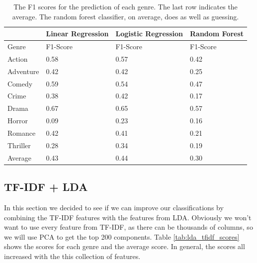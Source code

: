 \documentclass[11pt]{article}
\begin{document}
\begin{table}[h]
	\label{tab:lda_scores}
\begin{center}
	\begin{tabular}{| l | l | l | l |}
		\hline
		           & Linear Regression & Logistic Regression & Random Forest \\
		\hline
		Genre      & F1-Score          & F1-Score            & F1-Score       \\
	  	\hline			
	  	Action     & 0.58              & 0.57                & 0.42 \\
	  	Adventure  & 0.42              & 0.42                & 0.25 \\ 
	  	Comedy     & 0.59              & 0.54                & 0.47 \\
	  	Crime      & 0.38              & 0.42                & 0.17 \\
	  	Drama      & 0.67              & 0.65                & 0.57 \\
	  	Horror     & 0.09              & 0.23                & 0.16 \\
	  	Romance    & 0.42              & 0.41                & 0.21 \\
	  	Thriller   & 0.28              & 0.34                & 0.19 \\
	  	\hline
	  	Average    & 0.43              & 0.44                & 0.30 \\
	  \hline  
	\end{tabular}
\end{center}
	\caption{The F1 scores for the prediction of each genre. The last row indicates the average. The random forest classifier, on average, does as well as guessing.}
\end{table}

\subsection{TF-IDF + LDA}
\label{sec:tfidf_lda}

In this section we decided to see if we can improve our classifications by combining the TF-IDF features with the features from LDA. Obviously we won't want to use every feature from TF-IDF, as there can be thousands of columns, so we will use PCA to get the top 200 components. Table \ref{tab:lda_tfidf_scores} shows the scores for each genre and the average score. In general, the scores all increased with the this collection of features. 
\end{document}
